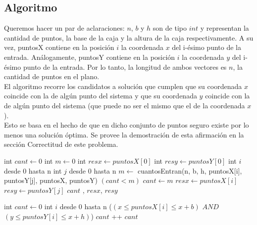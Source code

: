 \subsection{Algoritmo} 

\indent Queremos hacer un par de aclaraciones: $n$, $b$ y $h$ son de tipo $int$ y representan la cantidad de puntos, la base de la caja y la altura de la caja respectivamente. A su vez, puntosX contiene en la posici\'on $i$ la coordenada $x$ del i-\'esimo punto de la entrada. An\'alogamente, puntosY contiene en la posici\'on $i$ la coordenada $y$ del i-\'esimo punto de la entrada. Por lo tanto, la longitud de ambos vectores es $n$, la cantidad de puntos en el plano.\\
\indent El algoritmo recorre los candidatos a soluci\'on que cumplen que su coordenada $x$ coincide con la de alg\'un punto del sistema y que su coordenada $y$ coincide con la de alg\'un punto del sistema (que puede no ser el mismo que el de la coordenada $x$).\\
\indent Esto se basa en el hecho de que en dicho conjunto de puntos seguro existe por lo menos una soluci\'on \'optima. Se provee la demostraci\'on de esta afirmaci\'on en la secci\'on Correctitud de este problema.\\


\begin{algorithm}[H]
\caption{} 
\begin{codebox}
\li int $cant \gets 0$
\li int $m \gets 0$
\li int $resx \gets puntosX[0]$
\li int $resy \gets puntosY[0]$
\li \For int $i$ desde 0 hasta n \Do
\li		\For int $j$ desde 0 hasta n \Do
\li 		$m \gets $ cuantosEntran(n, b, h, puntosX[i], puntosY[j], puntosX, puntosY)
\li 		\If $(cant<m)$ 
\li				\Then   $cant \gets m$
\li 					$resx \gets puntosX[i]$
\li 					$resy \gets puntosY[j]$
				\End
			\End
		\End
	\End
\li \Return $cant$ , $resx$, $resy$

\End
\end{codebox}
\end{algorithm}


\begin{algorithm}[H]
\caption{} 
\begin{codebox}
\li int $cant \gets 0$
\li \For int $i$ desde 0 hasta n \Do
\li 	\If ($(x \leq puntosX[i] \leq x+b)$  $AND$  $(y \leq puntosY[i] \leq x+h)$) \Do
\li 		$cant$ ++		
 		\End
 	\End	
\li \Return $cant $
\End
\end{codebox}
\end{algorithm}


